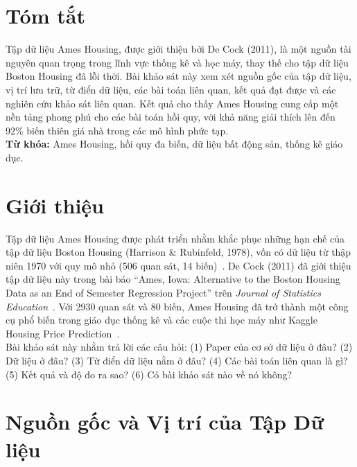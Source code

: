 \documentclass{article}
\begin{document}
\section*{Tóm tắt}
Tập dữ liệu Ames Housing, được giới thiệu bởi De Cock (2011), là một nguồn tài nguyên quan trọng trong lĩnh vực thống kê và học máy, thay thế cho tập dữ liệu Boston Housing đã lỗi thời. Bài khảo sát này xem xét nguồn gốc của tập dữ liệu, vị trí lưu trữ, từ điển dữ liệu, các bài toán liên quan, kết quả đạt được và các nghiên cứu khảo sát liên quan. Kết quả cho thấy Ames Housing cung cấp một nền tảng phong phú cho các bài toán hồi quy, với khả năng giải thích lên đến 92\% biến thiên giá nhà trong các mô hình phức tạp. \\
\textbf{Từ khóa:} Ames Housing, hồi quy đa biến, dữ liệu bất động sản, thống kê giáo dục.

\section{Giới thiệu}
Tập dữ liệu Ames Housing được phát triển nhằm khắc phục những hạn chế của tập dữ liệu Boston Housing (Harrison \& Rubinfeld, 1978), vốn có dữ liệu từ thập niên 1970 với quy mô nhỏ (506 quan sát, 14 biến)~\cite{harrison1978}. De Cock (2011) đã giới thiệu tập dữ liệu này trong bài báo “Ames, Iowa: Alternative to the Boston Housing Data as an End of Semester Regression Project” trên \textit{Journal of Statistics Education}~\cite{decock2011}. Với 2930 quan sát và 80 biến, Ames Housing đã trở thành một công cụ phổ biến trong giáo dục thống kê và các cuộc thi học máy như Kaggle Housing Price Prediction~\cite{kaggle2016}. \\
Bài khảo sát này nhằm trả lời các câu hỏi: (1) Paper của cơ sở dữ liệu ở đâu? (2) Dữ liệu ở đâu? (3) Từ điển dữ liệu nằm ở đâu? (4) Các bài toán liên quan là gì? (5) Kết quả và độ đo ra sao? (6) Có bài khảo sát nào về nó không?

\section{Nguồn gốc và Vị trí của Tập Dữ liệu}
\end{document}
